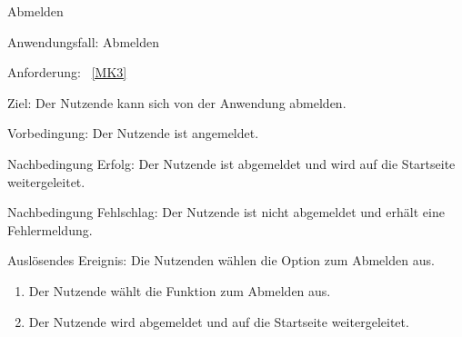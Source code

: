 \begin{function}{30}{Abmelden}
    \item[Anwendungsfall:] Abmelden
    \item[Anforderung:]~\ref{MK3}
    \item[Ziel:] Der Nutzende kann sich von der Anwendung abmelden.
    \item[Vorbedingung:] Der Nutzende ist angemeldet.
    \item[Nachbedingung Erfolg:] Der Nutzende ist abgemeldet und wird auf die Startseite weitergeleitet.
    \item[Nachbedingung Fehlschlag:] Der Nutzende ist nicht abgemeldet und erhält eine Fehlermeldung.
    \item[Auslösendes Ereignis:] Die Nutzenden wählen die Option zum Abmelden aus.
    \begin{enumerate}
        \item Der Nutzende wählt die Funktion zum Abmelden aus.
        \item Der Nutzende wird abgemeldet und auf die Startseite weitergeleitet.
    \end{enumerate}
\end{function}


\pagebreak

